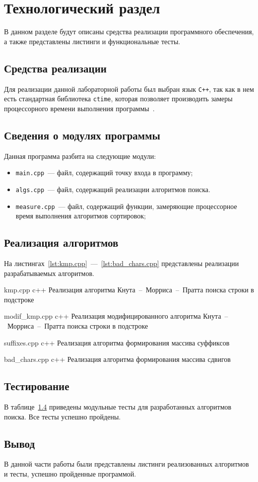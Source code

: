 \chapter{Технологический раздел}
В данном разделе будут описаны средства реализации программного обеспечения, а также представлены листинги и функциональные тесты.

\section{Средства реализации}
Для реализации данной лабораторной работы был выбран язык \texttt{C++}, так как в нем есть стандартная библиотека \texttt{ctime}, которая позволяет производить замеры процессорного времени выполнения программы~\cite{cpp-lang}. 

\section{Сведения о модулях программы}
Данная программа разбита на следующие модули:
\begin{itemize}
	\item \texttt{main.cpp}~--- файл, содержащий точку входа в программу;
	\item \texttt{algs.cpp}~--- файл, содержащий реализации алгоритмов поиска.
	\item \texttt{measure.cpp}~--- файл, содержащий функции, замеряющие процессорное время выполнения алгоритмов сортировок;
\end{itemize}
	
\section{Реализация алгоритмов}
На листингах~\ref{lst:kmp.cpp}~---~\ref{lst:bad_chars.cpp} представлены реализации разрабатываемых алгоритмов.

{kmp.cpp}
{c++}
{Реализация алгоритма Кнута~--~Морриса~--~Пратта поиска строки в подстроке}

{modif_kmp.cpp}
{c++}
{Реализация модифицированного алгоритма Кнута~--~Морриса~--~Пратта поиска строки в подстроке}

{suffixes.cpp}
{c++}
{Реализация алгоритма формирования массива суффиксов}

{bad_chars.cpp}
{c++}
{Реализация алгоритма формирования массива сдвигов}

\section{Тестирование}
В таблице~\ref{} приведены модульные тесты для разработанных алгоритмов поиска. Все тесты успешно пройдены.

\section*{Вывод}
В данной части работы были представлены листинги реализованных алгоритмов и тесты, успешно пройденные программой.
